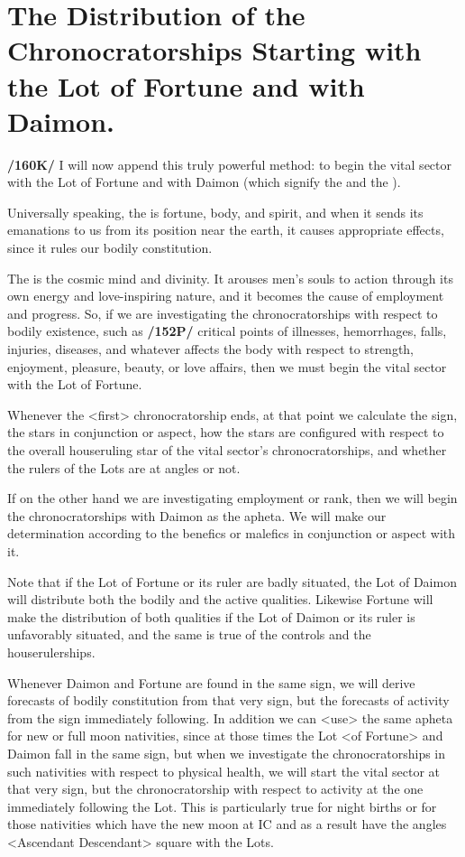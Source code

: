 \section{The Distribution of the Chronocratorships Starting with the Lot of Fortune and with Daimon.}

\textbf{/160K/} I will now append this truly powerful method: to begin the vital sector with the Lot of Fortune and with Daimon (which signify the \Moon\xspace and the \Sun).

Universally speaking, the \Moon\xspace is fortune, body, and
spirit, and when it sends its emanations to us from its position near the earth, it causes appropriate effects, since it rules our bodily constitution. 

The \Sun\xspace is the cosmic mind and divinity. It arouses men’s souls to action through its own energy and love-inspiring nature, and it becomes the cause of employment and progress.
So, if we are investigating the chronocratorships with respect to bodily existence, such as \textbf{/152P/} critical points of illnesses, hemorrhages, falls, injuries, diseases, and whatever affects the body with respect to strength, enjoyment, pleasure, beauty, or love affairs, then we must begin the vital sector with the Lot of Fortune. 

Whenever the <first> chronocratorship ends, at that point we calculate the sign, the stars in conjunction or aspect, how the stars are configured with respect to the overall houseruling star of the vital sector’s chronocratorships, and whether the rulers of the Lots are at angles or not.

If on the other hand we are investigating employment or rank, then we will begin the chronocratorships with Daimon as the apheta. We will make our determination according to the benefics or malefics in conjunction or aspect with it.

Note that if the Lot of Fortune or its ruler are badly situated, the Lot of Daimon will distribute both the bodily and the active qualities. Likewise Fortune will make the distribution of both qualities if the Lot of Daimon or its ruler is unfavorably situated, and the same is true of the controls and the houserulerships.

Whenever Daimon and Fortune are found in the same sign, we will derive forecasts of bodily constitution from that very sign, but the forecasts of activity from the sign immediately following. In addition we can <use> the same apheta for new or full moon nativities, since at those times the Lot <of
Fortune> and Daimon fall in the same sign, but when we investigate the chronocratorships in such nativities with respect to physical health, we will start the vital sector at that very sign, but the chronocratorship with respect to activity at the one immediately following the Lot. This is particularly true for night births or for those nativities which have the new moon at IC and as a result have the angles
<Ascendant Descendant> square with the Lots. 

